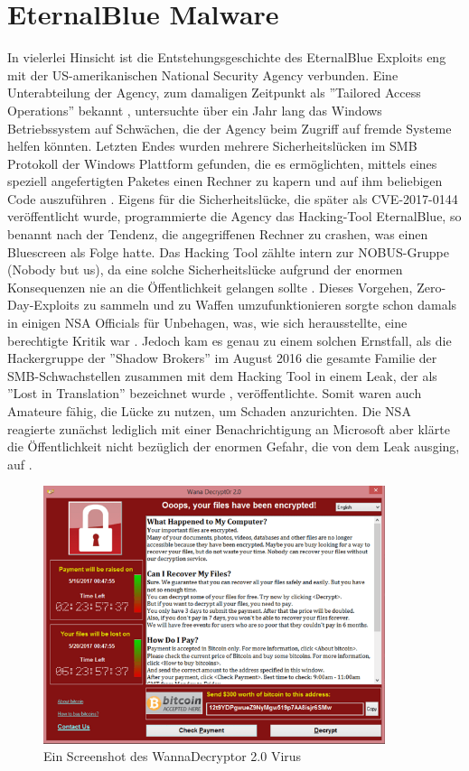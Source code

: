 \documentclass[DIV=12,headings=normal,pdftex,headinclude=false,footinclude=false,final]{scrreprt}
\begin{document}
\chapter{EternalBlue Malware}
In vielerlei Hinsicht ist die Entstehungsgeschichte des EternalBlue Exploits eng mit der US-amerikanischen National Security Agency verbunden. Eine Unterabteilung der Agency, zum damaligen Zeitpunkt als ''Tailored Access Operations'' bekannt \cite{CS}, untersuchte über ein Jahr lang das Windows Betriebssystem auf Schwächen, die der Agency beim Zugriff auf fremde Systeme helfen könnten\cite{WP}. Letzten Endes wurden mehrere Sicherheitslücken im SMB Protokoll der Windows Plattform gefunden, die es ermöglichten, mittels eines speziell angefertigten Paketes einen Rechner zu kapern und auf ihm beliebigen Code auszuführen \cite{Avast}.
Eigens für die Sicherheitslücke, die später als CVE-2017-0144 veröffentlicht wurde, programmierte die Agency das Hacking-Tool EternalBlue, so benannt nach der Tendenz, die angegriffenen Rechner zu crashen, was einen Bluescreen als Folge hatte. Das Hacking Tool zählte intern zur NOBUS-Gruppe (Nobody but us), da eine solche Sicherheitslücke aufgrund der enormen Konsequenzen nie an die Öffentlichkeit gelangen sollte \cite{CS}. Dieses Vorgehen, Zero-Day-Exploits zu sammeln und zu Waffen umzufunktionieren sorgte schon damals in einigen NSA Officials für Unbehagen, was, wie sich herausstellte, eine berechtigte Kritik war \cite{WP}.
Jedoch kam es genau zu einem solchen Ernstfall, als die Hackergruppe der ''Shadow Brokers'' im August 2016 die gesamte Familie der SMB-Schwachstellen zusammen mit dem Hacking Tool in einem Leak, der als ''Lost in Translation'' bezeichnet wurde \cite{Medium:ExpBible}, veröffentlichte. Somit waren auch Amateure fähig, die Lücke zu nutzen, um Schaden anzurichten. Die NSA reagierte zunächst lediglich mit einer Benachrichtigung an Microsoft aber klärte die Öffentlichkeit nicht bezüglich der enormen Gefahr, die von dem Leak ausging, auf \cite{WP}.

\begin{figure}[H]
    \centering
    \includegraphics[width=10cm]{wanna_decrypt0r_2.0.png}
    \caption[WannaDecryptor Screenshot (SecureList) URL: \url{securelist.com/wannacry-ransomware-used-in-widespread-attacks-all-over-the-world/78351/}]{Ein Screenshot des  WannaDecryptor 2.0 Virus}
    \label{img:wanna_decrypt0r}
\end{figure}
\end{document}
